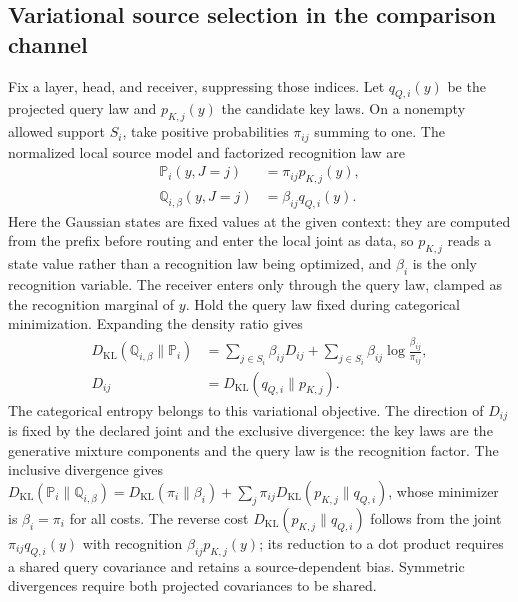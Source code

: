 \documentclass[twoside,11pt]{article}
\begin{document}
\subsection{Variational source selection in the comparison channel}
\label{sec:mixture_derivation}
Fix a layer, head, and receiver, suppressing those indices. Let $q_{Q,i}(y)$ be the projected query law and $p_{K,j}(y)$ the candidate key laws. On a nonempty allowed support $S_i$, take positive probabilities $\pi_{ij}$ summing to one. The normalized local source model and factorized recognition law are
\begin{align}
\mathbb P_i(y,J=j)&=\pi_{ij}p_{K,j}(y),\label{eq:mixture_joint}\\
\mathbb Q_{i,\beta}(y,J=j)&=\beta_{ij}q_{Q,i}(y).\label{eq:mixture_posterior}
\end{align}
Here the Gaussian states are fixed values at the given context: they are computed from the prefix before routing and enter the local joint as data, so $p_{K,j}$ reads a state value rather than a recognition law being optimized, and $\beta_i$ is the only recognition variable. The receiver enters only through the query law, clamped as the recognition marginal of $y$. Hold the query law fixed during categorical minimization. Expanding the density ratio gives
\begin{align}
D_{\mathrm{KL}}(\mathbb Q_{i,\beta}\|\mathbb P_i)
&=\sum_{j\in S_i}\beta_{ij}D_{ij}
+\sum_{j\in S_i}\beta_{ij}\log\frac{\beta_{ij}}{\pi_{ij}},
\label{eq:mixture_free_energy}\\
D_{ij}&=D_{\mathrm{KL}}(q_{Q,i}\|p_{K,j}).
\label{eq:mixture_energy_entropy}
\end{align}
The categorical entropy belongs to this variational objective. The direction of $D_{ij}$ is fixed by the declared joint and the exclusive divergence: the key laws are the generative mixture components and the query law is the recognition factor. The inclusive divergence gives $D_{\mathrm{KL}}(\mathbb P_i\|\mathbb Q_{i,\beta})=D_{\mathrm{KL}}(\pi_i\|\beta_i)+\sum_j\pi_{ij}D_{\mathrm{KL}}(p_{K,j}\|q_{Q,i})$, whose minimizer is $\beta_i=\pi_i$ for all costs. The reverse cost $D_{\mathrm{KL}}(p_{K,j}\|q_{Q,i})$ follows from the joint $\pi_{ij}q_{Q,i}(y)$ with recognition $\beta_{ij}p_{K,j}(y)$; its reduction to a dot product requires a shared query covariance and retains a source-dependent bias. Symmetric divergences require both projected covariances to be shared.
\end{document}
